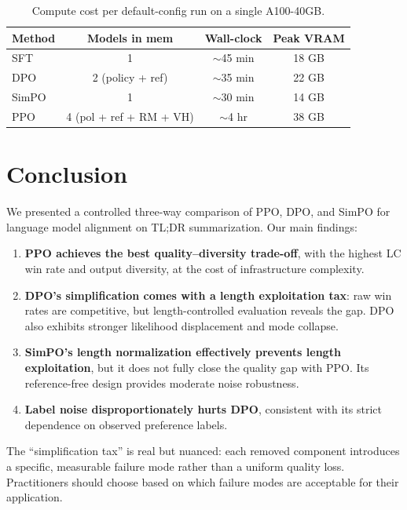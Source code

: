\documentclass[10pt,twocolumn,letterpaper]{article}
\begin{document}
\begin{table}[t]
\centering
\small
\caption{Compute cost per default-config run on a single A100-40GB.}
\label{tab:compute}
\begin{tabular}{lccc}
\toprule
Method & Models in mem & Wall-clock & Peak VRAM \\
\midrule
SFT   & 1 & ${\sim}$45 min & 18 GB \\
DPO   & 2 (policy + ref) & ${\sim}$35 min & 22 GB \\
SimPO & 1 & ${\sim}$30 min & 14 GB \\
PPO   & 4 (pol + ref + RM + VH) & ${\sim}$4 hr & 38 GB \\
\bottomrule
\end{tabular}
\end{table}

\section{Conclusion}

We presented a controlled three-way comparison of PPO, DPO, and SimPO for language model alignment on TL;DR summarization. Our main findings:

\begin{enumerate}
    \item \textbf{PPO achieves the best quality--diversity trade-off}, with the highest LC win rate and output diversity, at the cost of infrastructure complexity.
    \item \textbf{DPO's simplification comes with a length exploitation tax}: raw win rates are competitive, but length-controlled evaluation reveals the gap. DPO also exhibits stronger likelihood displacement and mode collapse.
    \item \textbf{SimPO's length normalization effectively prevents length exploitation}, but it does not fully close the quality gap with PPO. Its reference-free design provides moderate noise robustness.
    \item \textbf{Label noise disproportionately hurts DPO}, consistent with its strict dependence on observed preference labels.
\end{enumerate}

The ``simplification tax'' is real but nuanced: each removed component introduces a specific, measurable failure mode rather than a uniform quality loss. Practitioners should choose based on which failure modes are acceptable for their application.
\end{document}
